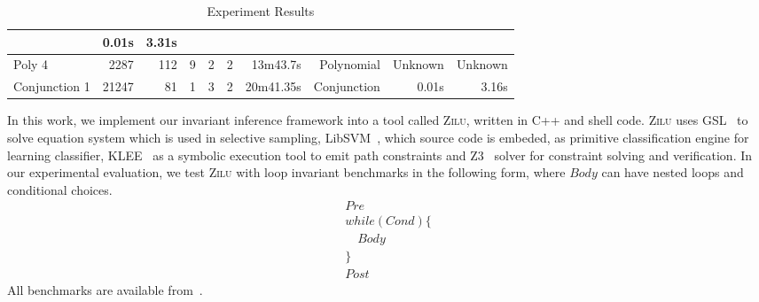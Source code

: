 \begin{table*}[t]
\begin{center}
\begin{center}
\begin{adjustbox}{max width=1\textwidth}
\begin{tabular}{l | r | r | r | r | r | r | r | r | r}
            & 0.01s & 3.31s 
            \\
        \hline
        Poly 4 
            & 2287 & 112 & 9
            & 2 & 2
            & 13m43.7s & Polynomial
            & Unknown & Unknown 
            \\
        \hline
        Conjunction 1
            & 21247 & 81 & 1 
            & 3 & 2 
            & 20m41.35s & Conjunction
            & 0.01s & 3.16s
            \\
        \hline
    \end{tabular}
    \end{adjustbox}
    \end{center}
    \end{center}
    \caption{Experiment Results}
    \label{tab:experiments}
\end{table*}

In this work, we implement our invariant inference framework into a tool called \textsc{Zilu}, 
written in C++ and shell code. 
\textsc{Zilu} uses GSL~\cite{gough2009gnu} to solve equation system which is used in selective sampling, 
LibSVM~\cite{chang2011libsvm}, which source code is embeded, as primitive classification engine for learning classifier, 
KLEE~\cite{cadar2008klee} as a symbolic execution tool to emit path constraints 
and Z3~\cite{de2008z3} solver for constraint solving and verification. 
In our experimental evaluation, 
we test \textsc{Zilu} with  loop invariant benchmarks 
in the following form, where $\mathit{Body}$ can have nested loops and conditional choices. 
\begin{align*}
&Pre&\\
&while (Cond) \{&\\
&  \quad Body &\\
&\} &\\
&Post &
\end{align*}
All benchmarks are available from~\cite{zilu}. 


